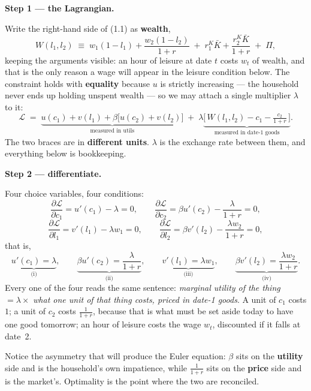 \documentclass[11pt, a4paper]{article}
\newcommand{\passo}[1]{\medskip\noindent\textbf{#1}\par\nobreak}
\newcommand{\Kb}{\bar K}
\begin{document}
\passo{Step 1 --- the Lagrangian.} Write the right-hand side of (1.1) as \textbf{wealth},
\[
W(l_1,l_2)\;\equiv\;w_1(1-l_1)+\frac{w_2(1-l_2)}{1+r}
\;+\;r^K_1\Kb+\frac{r^K_2\Kb}{1+r}\;+\;\Pi ,
\]
keeping the arguments visible: an hour of leisure at date $t$ costs $w_t$ of wealth, and
that is the only reason a wage will appear in the leisure condition below. The constraint
holds with \textbf{equality} because $u$ is strictly increasing --- the household never
ends up holding unspent wealth --- so we may attach a single multiplier $\lambda$ to it:
\[
\mathcal{L}\;=\;\underbrace{u(c_1)+v(l_1)+\beta\big[u(c_2)+v(l_2)\big]}_{\text{measured in utils}}
\;+\;\lambda\underbrace{\Big[\,W(l_1,l_2)-c_1-\tfrac{c_2}{1+r}\,\Big]}_{\text{measured in date-1 goods}} .
\]
The two braces are in \textbf{different units}. $\lambda$ is the exchange rate between
them, and everything below is bookkeeping.

\passo{Step 2 --- differentiate.} Four choice variables, four conditions:
\[
\frac{\partial\mathcal{L}}{\partial c_1}=u'(c_1)-\lambda=0,
\qquad
\frac{\partial\mathcal{L}}{\partial c_2}=\beta u'(c_2)-\frac{\lambda}{1+r}=0,
\]
\[
\frac{\partial\mathcal{L}}{\partial l_1}=v'(l_1)-\lambda w_1=0,
\qquad
\frac{\partial\mathcal{L}}{\partial l_2}=\beta v'(l_2)-\frac{\lambda w_2}{1+r}=0,
\]
that is,
\[
\underbrace{u'(c_1)=\lambda}_{\text{(i)}},\qquad
\underbrace{\beta u'(c_2)=\frac{\lambda}{1+r}}_{\text{(ii)}},\qquad
\underbrace{v'(l_1)=\lambda w_1}_{\text{(iii)}},\qquad
\underbrace{\beta v'(l_2)=\frac{\lambda w_2}{1+r}}_{\text{(iv)}} .
\]
Every one of the four reads the same sentence: \emph{marginal utility of the thing}
$=\lambda\times$ \emph{what one unit of that thing costs, priced in date-1 goods}. A unit
of $c_1$ costs $1$; a unit of $c_2$ costs $\tfrac{1}{1+r}$, because that is what must be
set aside today to have one good tomorrow; an hour of leisure costs the wage $w_t$,
discounted if it falls at date~2.

Notice the asymmetry that will produce the Euler equation: $\beta$ sits on the
\textbf{utility} side and is the household's own impatience, while $\tfrac{1}{1+r}$ sits
on the \textbf{price} side and is the market's. Optimality is the point where the two are
reconciled.
\end{document}
